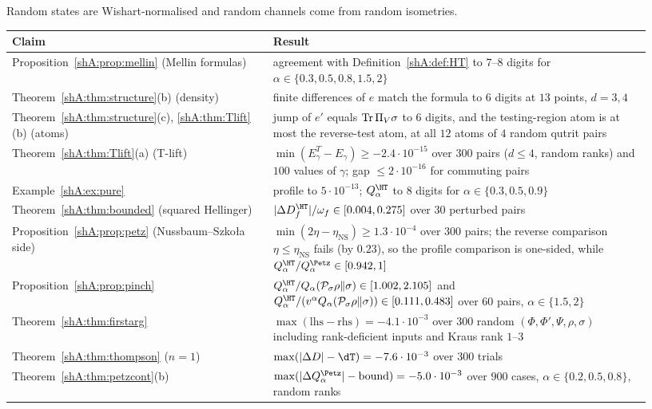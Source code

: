 Random states are Wishart-normalised and random channels come from random isometries.
{\small
\begin{longtable}{>{\raggedright\arraybackslash}p{0.38\linewidth}>{\raggedright\arraybackslash}p{0.55\linewidth}}
\toprule
Claim & Result\\
\midrule
\endhead
Proposition~\ref{shA:prop:mellin} (Mellin formulas) & agreement with Definition~\ref{shA:def:HT} to $7$--$8$ digits for $\alpha\in\{0.3,0.5,0.8,1.5,2\}$\\
Theorem~\ref{shA:thm:structure}(b) (density) & finite differences of $e$ match the formula to $6$ digits at $13$ points, $d=3,4$\\
Theorem~\ref{shA:thm:structure}(c), \ref{shA:thm:Tlift}(b) (atoms) & jump of $e'$ equals $\operatorname{Tr}\Pi_V\sigma$ to $6$ digits, and the testing-region atom is at most the reverse-test atom, at all $12$ atoms of $4$ random qutrit pairs\\
Theorem~\ref{shA:thm:Tlift}(a) (T-lift) & $\min(E^T_\gamma-E_\gamma)\ge-2.4\cdot10^{-15}$ over $300$ pairs ($d\le4$, random ranks) and $100$ values of $\gamma$; gap $\le2\cdot10^{-16}$ for commuting pairs\\
Example~\ref{shA:ex:pure} & profile to $5\cdot10^{-13}$; $Q^\HT_\alpha$ to $8$ digits for $\alpha\in\{0.3,0.5,0.9\}$\\
Theorem~\ref{shA:thm:bounded} (squared Hellinger) & $|\Delta D^\HT_f|/\omega_f\in[0.004,0.275]$ over $30$ perturbed pairs\\
Proposition~\ref{shA:prop:petz} (Nussbaum--Szko{\l}a side) & $\min(2\eta-\eta_{\mathrm{NS}})\ge1.3\cdot10^{-4}$ over $300$ pairs; the reverse comparison $\eta\le\eta_{\mathrm{NS}}$ fails (by $0.23$), so the profile comparison is one-sided, while $Q^\HT_\alpha/Q^\Petz_\alpha\in[0.942,1]$\\
Proposition~\ref{shA:prop:pinch} & $Q^\HT_\alpha/Q_\alpha(\mathcal P_\sigma\rho\|\sigma)\in[1.002,2.105]$ and $Q^\HT_\alpha/(v^\alpha Q_\alpha(\mathcal P_\sigma\rho\|\sigma))\in[0.111,0.483]$ over $60$ pairs, $\alpha\in\{1.5,2\}$\\
Theorem~\ref{shA:thm:firstarg} & $\max(\text{lhs}-\text{rhs})=-4.1\cdot10^{-3}$ over $300$ random $(\Phi,\Phi',\Psi,\rho,\sigma)$ including rank-deficient inputs and Kraus rank $1$--$3$\\
Theorem~\ref{shA:thm:thompson} ($n=1$) & $\max(|\Delta D|-\dT)=-7.6\cdot10^{-3}$ over $300$ trials\\
Theorem~\ref{shA:thm:petzcont}(b) & $\max(|\Delta Q^\Petz_\alpha|-\text{bound})=-5.0\cdot10^{-3}$ over $900$ cases, $\alpha\in\{0.2,0.5,0.8\}$, random ranks\\

\end{longtable}}
